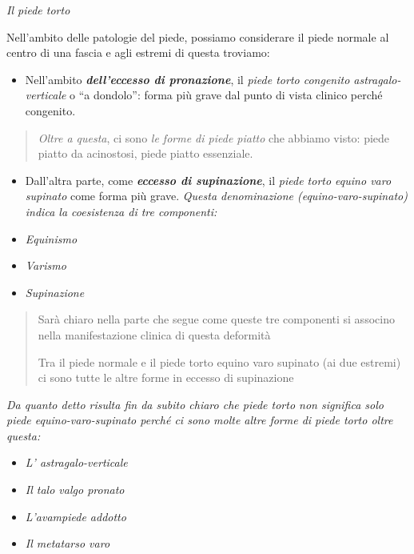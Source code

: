 \documentclass[]{article}
\date{}
\begin{document}
\emph{Il piede torto}

Nell'ambito delle patologie del piede, possiamo considerare il piede
normale al centro di una fascia e agli estremi di questa troviamo:

\begin{itemize}
\item
  Nell'ambito \textbf{\emph{dell'eccesso di pronazione}}, il \emph{piede
  torto congenito astragalo-verticale} o ``a dondolo'': forma più grave
  dal punto di vista clinico perché congenito.
\end{itemize}

\begin{quote}
\emph{Oltre a questa}, ci sono \emph{le forme di piede piatto} che
abbiamo visto: piede piatto da acinostosi, piede piatto essenziale.
\end{quote}

\begin{itemize}
\item
  Dall'altra parte, come \textbf{\emph{eccesso di supinazione}}, il
  \emph{piede torto equino varo supinato} come forma più grave.
  \emph{Questa denominazione (equino-varo-supinato) indica la
  coesistenza di tre componenti:}
\end{itemize}

\begin{itemize}
\item
  \emph{Equinismo}
\item
  \emph{Varismo}
\item
  \emph{Supinazione}
\end{itemize}

\begin{quote}
Sarà chiaro nella parte che segue come queste tre componenti si associno
nella manifestazione clinica di questa deformità

Tra il piede normale e il piede torto equino varo supinato (ai due
estremi) ci sono tutte le altre forme in eccesso di supinazione
\end{quote}

\emph{Da quanto detto risulta fin da subito chiaro che piede torto non
significa solo piede equino-varo-supinato perché ci sono molte altre
forme di piede torto oltre questa:}

\begin{itemize}
\item
  \emph{L' astragalo-verticale}
\item
  \emph{Il talo valgo pronato}
\item
  \emph{L'avampiede addotto}
\item
  \emph{Il metatarso varo}
\end{itemize}
\end{document}
